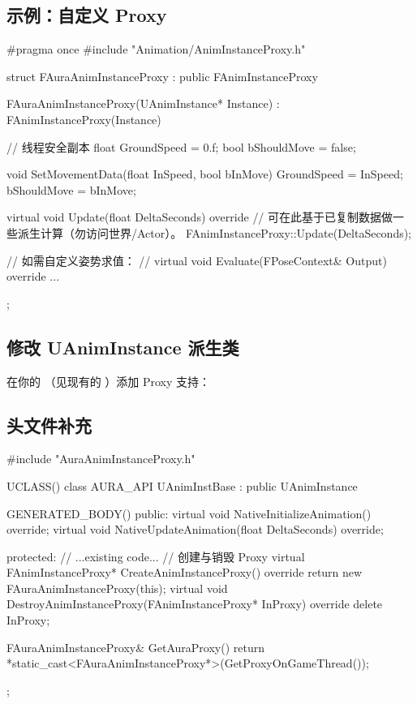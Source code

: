 \documentclass[10pt,openright,oneside,CJKmath]{MyBook}
\begin{document}
\subsection{示例：自定义 Proxy}
\begin{code}[caption={FAuraAnimInstanceProxy}]
#pragma once
#include "Animation/AnimInstanceProxy.h"

struct FAuraAnimInstanceProxy : public FAnimInstanceProxy
{
    FAuraAnimInstanceProxy(UAnimInstance* Instance)
        : FAnimInstanceProxy(Instance)
    {}

    // 线程安全副本
    float GroundSpeed = 0.f;
    bool  bShouldMove = false;

    void SetMovementData(float InSpeed, bool bInMove)
    {
        GroundSpeed = InSpeed;
        bShouldMove = bInMove;
    }

    virtual void Update(float DeltaSeconds) override
    {
        // 可在此基于已复制数据做一些派生计算（勿访问世界/Actor）。
        FAnimInstanceProxy::Update(DeltaSeconds);
    }

    // 如需自定义姿势求值：
    // virtual void Evaluate(FPoseContext& Output) override { ... }
};
\end{code}

\subsection{修改 UAnimInstance 派生类}
在你的 （见现有的 ）添加 Proxy 支持：

\subsection*{头文件补充}
\begin{code}[caption={AnimInstBase.h 关键补充}]
#include "AuraAnimInstanceProxy.h"

UCLASS()
class AURA_API UAnimInstBase : public UAnimInstance
{
    GENERATED_BODY()
public:
    virtual void NativeInitializeAnimation() override;
    virtual void NativeUpdateAnimation(float DeltaSeconds) override;

protected:
    // ...existing code...
    // 创建与销毁 Proxy
    virtual FAnimInstanceProxy* CreateAnimInstanceProxy() override
    {
        return new FAuraAnimInstanceProxy(this);
    }
    virtual void DestroyAnimInstanceProxy(FAnimInstanceProxy* InProxy) override
    {
        delete InProxy;
    }

    FAuraAnimInstanceProxy& GetAuraProxy()
    {
        return *static_cast<FAuraAnimInstanceProxy*>(GetProxyOnGameThread());
    }
};
\end{code}
\end{document}
